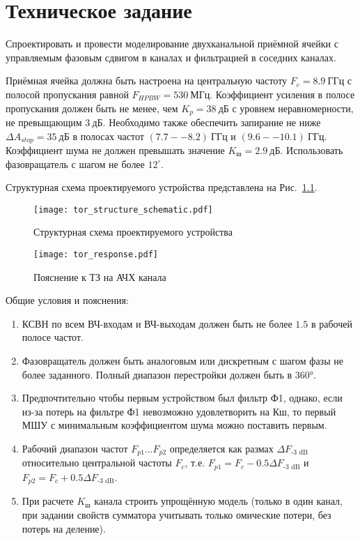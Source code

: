 \chapter{Техническое задание}

Спроектировать и провести моделирование двухканальной приёмной ячейки с управляемым фазовым сдвигом в каналах и фильтрацией в соседних каналах.

Приёмная ячейка должна быть настроена на центральную частоту $F_c = 8.9~\text{ГГц}$ с полосой пропускания равной $F_{HPBW} = 530~\text{МГц}$.
Коэффициент усиления в полосе пропускания должен быть не менее, чем $K_p = 38~\text{дБ}$ с уровнем неравномерности, не превыщающим $3~\text{дБ}$.
Необходимо также обеспечить запирание не ниже $\Delta A_{stop} = 35~\text{дБ}$ в полосах частот $(7.7--8.2)~\text{ГГц}$ и $(9.6--10.1)~\text{ГГц}$.
Коэффициент шума не должен превышать значение $K_{ш} = 2.9~\text{дБ}$.
Использовать фазовращатель с шагом не более $12^\circ$.

Структурная схема проектируемого устройства представлена на Рис.~\ref{fig:tor_structure_schematic}.

\begin{figure}[!ht]
    \centering
    \texttt{[image: tor\_structure\_schematic.pdf]}
    \caption{Структурная схема проектируемого устройства}%
    \label{fig:tor_structure_schematic}
\end{figure}

\begin{figure}[!ht]
    \centering
    \texttt{[image: tor\_response.pdf]}
    \caption{Пояснение к ТЗ на АЧХ канала}%
    \label{fig:tor_response}
\end{figure}

Общие условия и пояснения:
\begin{enumerate}
    \item
        КСВН по всем ВЧ-входам и ВЧ-выходам должен быть не более $1.5$ в рабочей полосе частот.
    \item
        Фазовращатель должен быть аналоговым или дискретным с шагом фазы не более заданного.
        Полный диапазон перестройки должен быть в 360°.
    \item
        Предпочтительно чтобы первым устройством был фильтр Ф1, однако, если из-за потерь на фильтре Ф1 невозможно удовлетворить на Кш, то первый МШУ с минимальным коэффициентом шума можно поставить первым.
    \item
        Рабочий диапазон частот $F_{p1} \ldots F_{p2}$ определяется как размах $\Delta F_\text{-3~dB}$ относительно центральной частоты $F_c$, т.е. $F_{p1} = F_c - 0.5 \Delta F_\text{-3~dB}$ и $F_{p2} = F_c + 0.5 \Delta F_\text{-3~dB}$.
    \item
        При расчете $K_\text{ш}$ канала строить упрощённую модель (только в один канал, при задании свойств сумматора учитывать только омические потери, без потерь на деление).
\end{enumerate}
